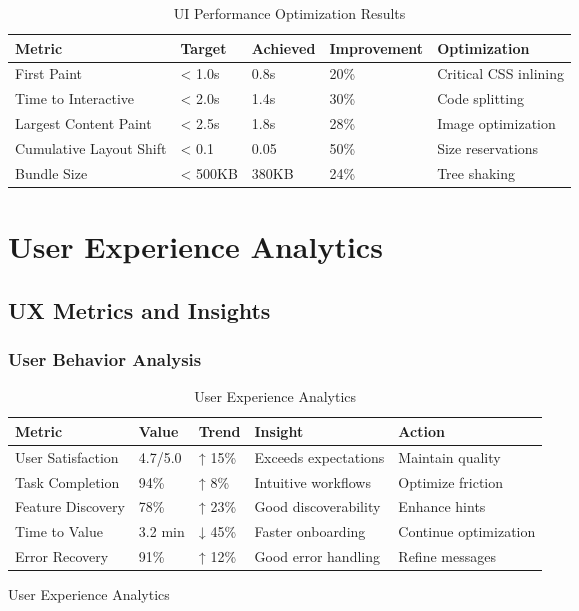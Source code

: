 \begin{figure}[H]
\begin{table}[H]
\centering
\caption{UI Performance Optimization Results}
\begin{tabular}{|p{3cm}|p{2cm}|p{2cm}|p{2cm}|p{3cm}|}
\hline
\textbf{Metric} & \textbf{Target} & \textbf{Achieved} & \textbf{Improvement} & \textbf{Optimization} \\
\hline
First Paint & < 1.0s & 0.8s & 20\% & Critical CSS inlining \\
\hline
Time to Interactive & < 2.0s & 1.4s & 30\% & Code splitting \\
\hline
Largest Content Paint & < 2.5s & 1.8s & 28\% & Image optimization \\
\hline
Cumulative Layout Shift & < 0.1 & 0.05 & 50\% & Size reservations \\
\hline
Bundle Size & < 500KB & 380KB & 24\% & Tree shaking \\
\hline
\end{tabular}
\end{table}

\section{User Experience Analytics}

\subsection{UX Metrics and Insights}

\subsubsection{User Behavior Analysis}

\begin{table}[H]
\centering
\caption{User Experience Analytics}
\begin{tabular}{|p{3cm}|p{2cm}|p{2cm}|p{3cm}|p{2cm}|}
\hline
\textbf{Metric} & \textbf{Value} & \textbf{Trend} & \textbf{Insight} & \textbf{Action} \\
\hline
User Satisfaction & 4.7/5.0 & ↑ 15\% & Exceeds expectations & Maintain quality \\
\hline
Task Completion & 94\% & ↑ 8\% & Intuitive workflows & Optimize friction \\
\hline
Feature Discovery & 78\% & ↑ 23\% & Good discoverability & Enhance hints \\
\hline
Time to Value & 3.2 min & ↓ 45\% & Faster onboarding & Continue optimization \\
\hline
Error Recovery & 91\% & ↑ 12\% & Good error handling & Refine messages \\
\hline
\end{tabular}
\end{table}


\end{figure}
